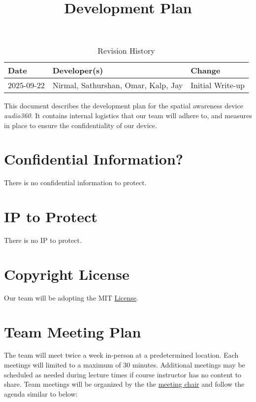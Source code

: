 \documentclass{article}
\title{Development Plan\\\progname}
\author{\authname}
\date{}
\begin{document}
\maketitle

\begin{table}[hp]
\caption{Revision History} \label{TblRevisionHistory}
\begin{tabularx}{\textwidth}{llX}
\toprule
\textbf{Date} & \textbf{Developer(s)} & \textbf{Change}\\
\midrule
2025-09-22 & Nirmal, Sathurshan, Omar, Kalp, Jay & Initial Write-up\\
\bottomrule
\end{tabularx}
\end{table}

\newpage{}

This document describes the development plan for the spatial awareness device \textit{audio360}. It contains internal logistics that our team will adhere to, and measures in place to ensure the confidentiality of our device.

\section{Confidential Information?}

There is no confidential information to protect.

\section{IP to Protect}

There is no IP to protect.

\section{Copyright License}

Our team will be adopting the MIT \href{https://github.com/Nirmal-code/SixSense/blob/main/LICENSE}{License}.

\section{Team Meeting Plan}

The team will meet twice a week in-person at a predetermined location.
Each meetings will limited to a maximum of 30 minutes.
Additional meetings may be scheduled as needed during lecture times if course instructor has no content to share.
Team meetings will be organized by the the \hyperref[role:meeting_chair]{meeting chair} and follow the agenda similar to below:
\end{document}
